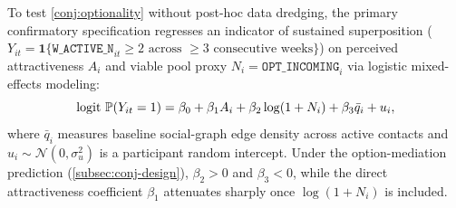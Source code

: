To test \cref{conj:optionality} without post-hoc data dredging, the primary
confirmatory specification regresses an indicator of sustained superposition
($Y_{it} = \mathbf{1}\{\texttt{W\_ACTIVE\_N}_{it} \ge 2 \text{ across } \ge 3\text{ consecutive weeks}\}$)
on perceived attractiveness $A_i$ and viable pool proxy
$N_i = \texttt{OPT\_INCOMING}_i$ via logistic mixed-effects modeling:
\begin{equation}
  \operatorname{logit}\,\mathbb{P}(Y_{it} = 1)
  = \beta_0 + \beta_1 A_i + \beta_2 \log(1 + N_i) + \beta_3 \bar{q}_i + u_i,
  \label{eq:instrument-regression}
\end{equation}
where $\bar{q}_i$ measures baseline social-graph edge density across active
contacts and $u_i \sim \mathcal{N}(0, \sigma_u^2)$ is a participant random
intercept. Under the option-mediation prediction (\cref{subsec:conj-design}),
$\beta_2 > 0$ and $\beta_3 < 0$, while the direct attractiveness coefficient
$\beta_1$ attenuates sharply once $\log(1 + N_i)$ is included.
